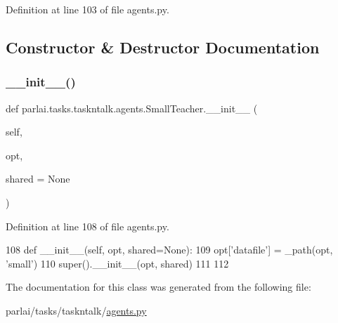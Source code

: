 Definition at line 103 of file agents.\+py.



\subsection{Constructor \& Destructor Documentation}
\mbox{\label{classparlai_1_1tasks_1_1taskntalk_1_1agents_1_1SmallTeacher_a840dfb1bc33447c389006c6b846babe0}} 
\subsubsection{\texorpdfstring{\+\_\+\+\_\+init\+\_\+\+\_\+()}{\_\_init\_\_()}}
{\footnotesize\ttfamily def parlai.\+tasks.\+taskntalk.\+agents.\+Small\+Teacher.\+\_\+\+\_\+init\+\_\+\+\_\+ (\begin{DoxyParamCaption}\item[{}]{self,  }\item[{}]{opt,  }\item[{}]{shared = {\ttfamily None} }\end{DoxyParamCaption})}



Definition at line 108 of file agents.\+py.


\begin{DoxyCode}
108     \textcolor{keyword}{def }\_\_init\_\_(self, opt, shared=None):
109         opt[\textcolor{stringliteral}{'datafile'}] = \_path(opt, \textcolor{stringliteral}{'small'})
110         super().\_\_init\_\_(opt, shared)
111 
112 
\end{DoxyCode}


The documentation for this class was generated from the following file\+:\begin{DoxyCompactItemize}
\item 
parlai/tasks/taskntalk/\hyperlink{parlai_2tasks_2taskntalk_2agents_8py}{agents.\+py}\end{DoxyCompactItemize}
